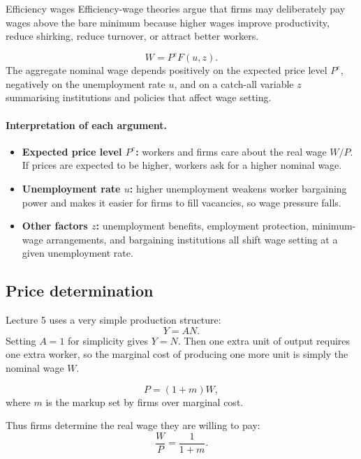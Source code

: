 \documentclass[12pt]{article}
\begin{document}
\begin{definition}{Efficiency wages}{}
Efficiency-wage theories argue that firms may deliberately pay wages above the bare minimum because higher wages improve productivity, reduce shirking, reduce turnover, or attract better workers.
\end{definition}

\begin{keyformula}
\[
W=P^eF(u,z).
\]
The aggregate nominal wage depends positively on the expected price level $P^e$, negatively on the unemployment rate $u$, and on a catch-all variable $z$ summarising institutions and policies that affect wage setting.
\end{keyformula}

\paragraph{Interpretation of each argument.}
\begin{itemize}[leftmargin=1.5em]
\item \textbf{Expected price level $P^e$:} workers and firms care about the real wage $W/P$. If prices are expected to be higher, workers ask for a higher nominal wage.
\item \textbf{Unemployment rate $u$:} higher unemployment weakens worker bargaining power and makes it easier for firms to fill vacancies, so wage pressure falls.
\item \textbf{Other factors $z$:} unemployment benefits, employment protection, minimum-wage arrangements, and bargaining institutions all shift wage setting at a given unemployment rate.
\end{itemize}

\subsection{Price determination}

Lecture 5 uses a very simple production structure:
\[
Y=AN.
\]
Setting $A=1$ for simplicity gives $Y=N$. Then one extra unit of output requires one extra worker, so the marginal cost of producing one more unit is simply the nominal wage $W$.

\begin{keyformula}
\[
P=(1+m)W,
\]
where $m$ is the markup set by firms over marginal cost.
\end{keyformula}

Thus firms determine the real wage they are willing to pay:
\[
\frac{W}{P}=\frac{1}{1+m}.
\]
\end{document}
